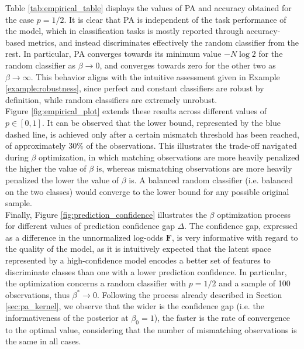 Table \ref{tab:empirical_table} displays the values of PA and accuracy
obtained for the case $p = 1/2$. It is clear that PA is independent of the task performance
of the model, which in classification tasks is mostly reported through accuracy-based metrics, and 
instead discriminates effectively the random classifier from the rest. In particular, 
PA converges towards its minimum value $-N \log{2}$ for the random classifier 
as $\beta \longrightarrow 0$, and converges towards zero for the 
other two as $\beta \longrightarrow \infty$. This behavior aligns with the 
intuitive assessment given in Example \ref{example:robustness}, since perfect and constant 
classifiers are robust by definition, while random classifiers are extremely unrobust. \\

Figure \ref{fig:empirical_plot} extends these results across different values of 
$p \in [0,1]$. It can be observed that the lower bound, represented by the blue dashed line, 
is achieved only after a certain mismatch threshold has been reached, of approximately 
30\% of the observations. This illustrates the trade-off navigated during $\beta$ optimization, 
in which matching observations are more heavily penalized the higher the value of $\beta$ is,
whereas mismatching observations are more heavily penalized the lower the value of $\beta$ is.
A balanced random classifier (i.e. balanced on the two classes) would converge to the
lower bound for any possible original sample. \\

Finally, Figure \ref{fig:prediction_confidence} illustrates the $\beta$ optimization
process for different values of prediction confidence gap $\Delta$. The confidence gap, 
expressed as a difference in the unnormalized log-odds $\bm{F}$, is very informative with 
regard to the quality of the model, as it is intuitively expected that the latent 
space represented by a high-confidence model encodes a better set of features 
to discriminate classes than one with a lower prediction confidence. 
In particular, the optimization concerns a random classifier with $p = 1/2$ and a
sample of 100 observations, thus $\beta^{*} \longrightarrow 0$. Following the process already 
described in Section \ref{sec:pa_kernel}, we observe that
the wider is the confidence gap (i.e. the informativeness of the posterior at $\beta_0 = 1$),
the faster is the rate of convergence to the optimal value, considering that the number of
mismatching observations is the same in all cases. \\

